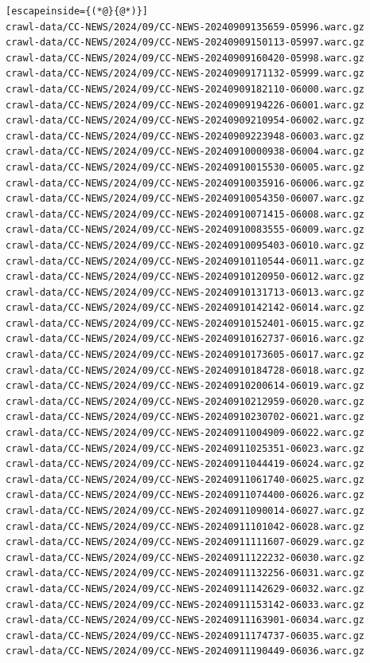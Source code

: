 \begin{lstlisting}[escapeinside={(*@}{@*)}]
crawl-data/CC-NEWS/2024/09/CC-NEWS-20240909135659-05996.warc.gz
crawl-data/CC-NEWS/2024/09/CC-NEWS-20240909150113-05997.warc.gz
crawl-data/CC-NEWS/2024/09/CC-NEWS-20240909160420-05998.warc.gz
crawl-data/CC-NEWS/2024/09/CC-NEWS-20240909171132-05999.warc.gz
crawl-data/CC-NEWS/2024/09/CC-NEWS-20240909182110-06000.warc.gz
crawl-data/CC-NEWS/2024/09/CC-NEWS-20240909194226-06001.warc.gz
crawl-data/CC-NEWS/2024/09/CC-NEWS-20240909210954-06002.warc.gz
crawl-data/CC-NEWS/2024/09/CC-NEWS-20240909223948-06003.warc.gz
crawl-data/CC-NEWS/2024/09/CC-NEWS-20240910000938-06004.warc.gz
crawl-data/CC-NEWS/2024/09/CC-NEWS-20240910015530-06005.warc.gz
crawl-data/CC-NEWS/2024/09/CC-NEWS-20240910035916-06006.warc.gz
crawl-data/CC-NEWS/2024/09/CC-NEWS-20240910054350-06007.warc.gz
crawl-data/CC-NEWS/2024/09/CC-NEWS-20240910071415-06008.warc.gz
crawl-data/CC-NEWS/2024/09/CC-NEWS-20240910083555-06009.warc.gz
crawl-data/CC-NEWS/2024/09/CC-NEWS-20240910095403-06010.warc.gz
crawl-data/CC-NEWS/2024/09/CC-NEWS-20240910110544-06011.warc.gz
crawl-data/CC-NEWS/2024/09/CC-NEWS-20240910120950-06012.warc.gz
crawl-data/CC-NEWS/2024/09/CC-NEWS-20240910131713-06013.warc.gz
crawl-data/CC-NEWS/2024/09/CC-NEWS-20240910142142-06014.warc.gz
crawl-data/CC-NEWS/2024/09/CC-NEWS-20240910152401-06015.warc.gz
crawl-data/CC-NEWS/2024/09/CC-NEWS-20240910162737-06016.warc.gz
crawl-data/CC-NEWS/2024/09/CC-NEWS-20240910173605-06017.warc.gz
crawl-data/CC-NEWS/2024/09/CC-NEWS-20240910184728-06018.warc.gz
crawl-data/CC-NEWS/2024/09/CC-NEWS-20240910200614-06019.warc.gz
crawl-data/CC-NEWS/2024/09/CC-NEWS-20240910212959-06020.warc.gz
crawl-data/CC-NEWS/2024/09/CC-NEWS-20240910230702-06021.warc.gz
crawl-data/CC-NEWS/2024/09/CC-NEWS-20240911004909-06022.warc.gz
crawl-data/CC-NEWS/2024/09/CC-NEWS-20240911025351-06023.warc.gz
crawl-data/CC-NEWS/2024/09/CC-NEWS-20240911044419-06024.warc.gz
crawl-data/CC-NEWS/2024/09/CC-NEWS-20240911061740-06025.warc.gz
crawl-data/CC-NEWS/2024/09/CC-NEWS-20240911074400-06026.warc.gz
crawl-data/CC-NEWS/2024/09/CC-NEWS-20240911090014-06027.warc.gz
crawl-data/CC-NEWS/2024/09/CC-NEWS-20240911101042-06028.warc.gz
crawl-data/CC-NEWS/2024/09/CC-NEWS-20240911111607-06029.warc.gz
crawl-data/CC-NEWS/2024/09/CC-NEWS-20240911122232-06030.warc.gz
crawl-data/CC-NEWS/2024/09/CC-NEWS-20240911132256-06031.warc.gz
crawl-data/CC-NEWS/2024/09/CC-NEWS-20240911142629-06032.warc.gz
crawl-data/CC-NEWS/2024/09/CC-NEWS-20240911153142-06033.warc.gz
crawl-data/CC-NEWS/2024/09/CC-NEWS-20240911163901-06034.warc.gz
crawl-data/CC-NEWS/2024/09/CC-NEWS-20240911174737-06035.warc.gz
crawl-data/CC-NEWS/2024/09/CC-NEWS-20240911190449-06036.warc.gz

\end{lstlisting}
